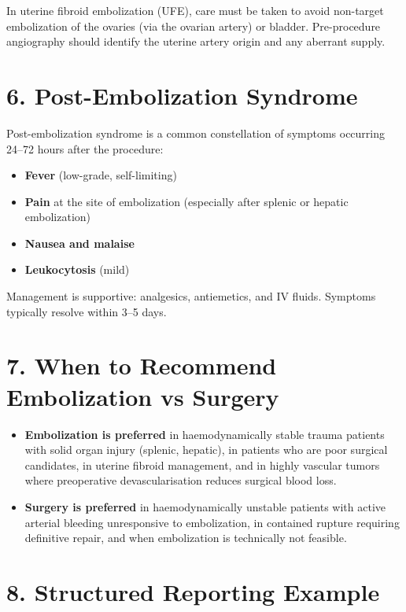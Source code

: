 \begin{pearlbox}
In uterine fibroid embolization (UFE), care must be taken to avoid non-target embolization of the ovaries (via the ovarian artery) or bladder. Pre-procedure angiography should identify the uterine artery origin and any aberrant supply.
\end{pearlbox}


\section{6. Post-Embolization Syndrome}

Post-embolization syndrome is a common constellation of symptoms occurring 24--72 hours after the procedure:
\begin{itemize}
  \item \textbf{Fever} (low-grade, self-limiting)
  \item \textbf{Pain} at the site of embolization (especially after splenic or hepatic embolization)
  \item \textbf{Nausea and malaise}
  \item \textbf{Leukocytosis} (mild)
\end{itemize}
Management is supportive: analgesics, antiemetics, and IV fluids. Symptoms typically resolve within 3--5 days.

\section{7. When to Recommend Embolization vs Surgery}

\begin{itemize}
  \item \textbf{Embolization is preferred} in haemodynamically stable trauma patients with solid organ injury (splenic, hepatic), in patients who are poor surgical candidates, in uterine fibroid management, and in highly vascular tumors where preoperative devascularisation reduces surgical blood loss.
  \item \textbf{Surgery is preferred} in haemodynamically unstable patients with active arterial bleeding unresponsive to embolization, in contained rupture requiring definitive repair, and when embolization is technically not feasible.
\end{itemize}


\section{8. Structured Reporting Example}

